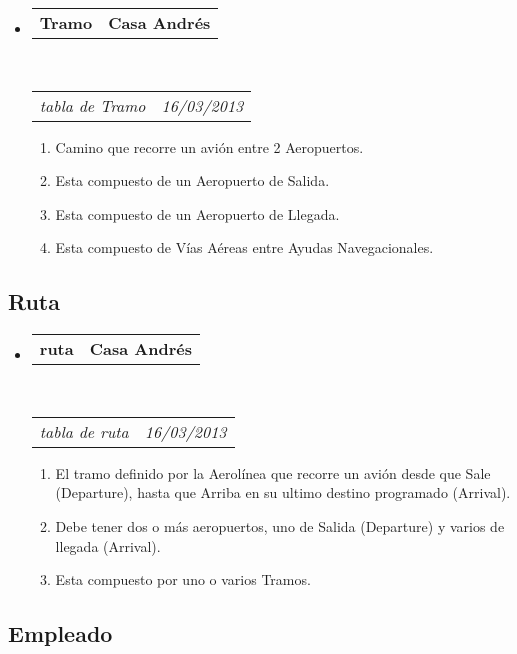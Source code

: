 \documentclass[10pt,letterpaper]{article}
\makeatletter
\newcommand{\headerrow}[2]
{\begin{tabular*}{\linewidth}{l@{\extracolsep{\fill}}r}
	#1 &
	#2 \\
\end{tabular*}}
\makeatother
\begin{document}
\begin{itemize}
	\parskip=0.1em

	\item
	\headerrow
		{\textbf{Tramo}}
		{\textbf{Casa Andrés}}
	\\
	\headerrow
		{\emph{tabla de Tramo}}
		{\emph{16/03/2013}}
	\begin{enumerate}
		\item Camino que recorre un avión entre 2 Aeropuertos.
		\item Esta compuesto de un Aeropuerto de Salida.
		\item Esta compuesto de un Aeropuerto de Llegada.
		\item Esta compuesto de Vías Aéreas entre Ayudas Navegacionales.
		
	\end{enumerate}

\end{itemize}


\subsection*{Ruta}

\begin{itemize}
	\parskip=0.1em

	\item
	\headerrow
		{\textbf{ruta}}
		{\textbf{Casa Andrés}}
	\\
	\headerrow
		{\emph{tabla de ruta}}
		{\emph{16/03/2013}}
	\begin{enumerate}
		\item El tramo definido por la Aerolínea que recorre un avión desde que Sale (Departure), hasta que Arriba en su ultimo destino programado (Arrival).
		\item Debe tener dos o más aeropuertos, uno de Salida (Departure) y varios de llegada (Arrival).
		\item Esta compuesto por uno o varios Tramos.
		
	\end{enumerate}

\end{itemize}


\subsection*{Empleado}
\end{document}
